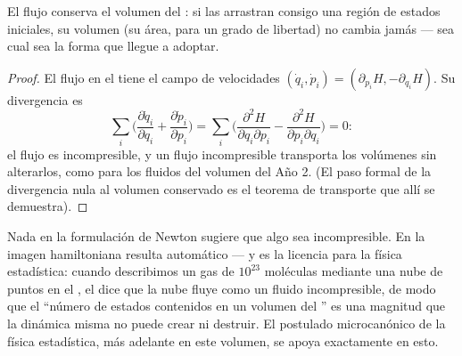 \begin{theorem}\label{thm:b3:hamiltonian-mechanics:liouville}
El flujo  conserva el volumen del : si las
 arrastran consigo una región de estados iniciales, su
volumen (su área, para un grado de libertad) no cambia jamás --- sea cual
sea la forma que llegue a adoptar.
\end{theorem}

\begin{proof}
El flujo en el  tiene el campo de velocidades $(\dot q_i, \dot p_i) =
(\partial_{p_i}H, -\partial_{q_i}H)$. Su divergencia es
\[
\sum_i\Big(\frac{\partial\dot q_i}{\partial q_i}
 + \frac{\partial\dot p_i}{\partial p_i}\Big)
 = \sum_i\Big(\frac{\partial^2H}{\partial q_i\partial p_i}
 - \frac{\partial^2H}{\partial p_i\partial q_i}\Big) = 0 :
\]
el flujo es incompresible, y un flujo incompresible transporta los volúmenes
sin alterarlos, como para los fluidos del volumen del Año 2. (El paso formal
de la divergencia nula al volumen conservado es el teorema de transporte que
allí se demuestra).
\end{proof}

\begin{remark}\label{rem:b3:hamiltonian-mechanics:liouville-matters}
Nada en la formulación de Newton sugiere que algo sea incompresible. En la
imagen hamiltoniana resulta automático --- y es la licencia para la física
estadística: cuando describimos un gas de $10^{23}$ moléculas mediante una
nube de puntos en el , el  dice que la
nube fluye como un fluido incompresible, de modo que el ``número de estados
contenidos en un volumen del '' es una magnitud que la
dinámica misma no puede crear ni destruir. El postulado microcanónico de la
física estadística, más adelante en este volumen, se apoya exactamente en
esto.
\end{remark}

